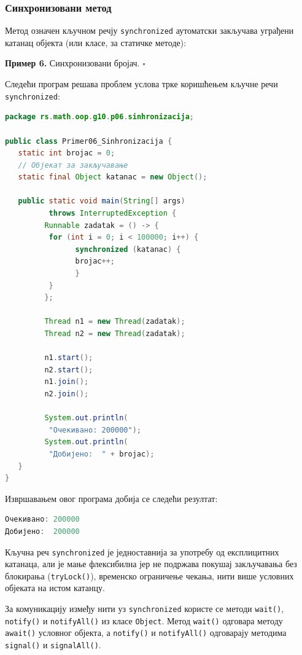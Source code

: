 \subsubsection{Синхронизовани метод}

Метод означен кључном речју \texttt{synchronized} аутоматски закључава уграђени катанац објекта (или класе, за статичке методе):


\bigskip

\noindent \textbf{Пример 6.} Синхронизовани бројач. $\square$

\medskip

Следећи програм решава проблем услова трке коришћењем кључне речи \texttt{synchronized}:


\begin{lstlisting}[language=Java]
package rs.math.oop.g10.p06.sinhronizacija;
 
public class Primer06_Sinhronizacija {
   static int brojac = 0;
   // Објекат за закључавање
   static final Object katanac = new Object();
 
   public static void main(String[] args)
          throws InterruptedException {
         Runnable zadatak = () -> {
          for (int i = 0; i < 100000; i++) {
                synchronized (katanac) {
                brojac++;
                }
          }
         };
 
         Thread n1 = new Thread(zadatak);
         Thread n2 = new Thread(zadatak);
 
         n1.start();
         n2.start();
         n1.join();
         n2.join();
 
         System.out.println(
          "Очекивано: 200000");
         System.out.println(
          "Добијено:  " + brojac);
   }
}
\end{lstlisting}


Извршавањем овог програма добија се следећи резултат:


\begin{lstlisting}[language=Java]
Очекивано: 200000
Добијено:  200000
\end{lstlisting}


Кључна реч \texttt{synchronized} је једноставнија за употребу од експлицитних катанаца, али је мање флексибилна јер не подржава покушај закључавања без блокирања (\texttt{tryLock()}), временско ограничење чекања, нити више условних објеката на истом катанцу.

За комуникацију између нити уз \texttt{synchronized} користе се методи \texttt{wait()}, \texttt{notify()} и \texttt{notifyAll()} из класе \texttt{Object}. Метод \texttt{wait()} одговара методу \texttt{await()} условног објекта, а \texttt{notify()} и \texttt{notifyAll()} одговарају методима \texttt{signal()} и \texttt{signalAll()}.


